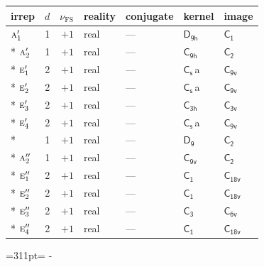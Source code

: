\documentclass[10pt,a4paper]{article}
\newcommand{\needspace}[1]{\par\penalty-100\begingroup\dimen0=#1\relax\dimen2=\pagegoal
  \advance\dimen2-\pagetotal\ifdim\dimen0>\dimen2\relax\ifdim\dimen2>0pt\vfil\break\fi\fi
  \endgroup}
\numberwithin{equation}{section}
\newcommand{\grp}[1]{\mathsf{#1}}
\newcommand{\irr}[1]{\text{\normalfont\scshape #1}}
\newcommand{\detbox}[1]{{\setlength{\fboxsep}{1pt}\fbox{#1}}}
\newcommand{\clsletter}[1]{\,{\scriptsize\color{black!55}#1}}
\newcommand{\fsind}{\nu_{\mathrm{FS}}}
\begin{document}
{\small\renewcommand{\arraystretch}{1.25}\begin{longtable}{@{}lrrllll@{}}\toprule
irrep & $d$ & $\fsind$ & reality & conjugate & kernel & image\\\midrule\endhead
\bottomrule\endfoot\endlastfoot
$\irr{a}_{1}'$ & 1 & $+1$ & real & --- & \href{D9h.pdf}{$\grp{D_{9h}}$} & \href{C1.pdf}{$\grp{C_{1}}$}\\*
$\irr{a}_{2}'$ & 1 & $+1$ & real & --- & \href{C9h.pdf}{$\grp{C_{9h}}$} & \href{C2.pdf}{$\grp{C_{2}}$}\\*
$\irr{e}_{1}'$ & 2 & $+1$ & real & --- & \href{C1v.pdf}{$\grp{C_{s}}$}\clsletter{a} & \href{C9v.pdf}{$\grp{C_{9v}}$}\\*
$\irr{e}_{2}'$ & 2 & $+1$ & real & --- & \href{C1v.pdf}{$\grp{C_{s}}$}\clsletter{a} & \href{C9v.pdf}{$\grp{C_{9v}}$}\\*
$\irr{e}_{3}'$ & 2 & $+1$ & real & --- & \href{C3h.pdf}{$\grp{C_{3h}}$} & \href{C3v.pdf}{$\grp{C_{3v}}$}\\*
$\irr{e}_{4}'$ & 2 & $+1$ & real & --- & \href{C1v.pdf}{$\grp{C_{s}}$}\clsletter{a} & \href{C9v.pdf}{$\grp{C_{9v}}$}\\*
\detbox{$\irr{a}_{1}''$} & 1 & $+1$ & real & --- & \href{D9.pdf}{$\grp{D_{9}}$} & \href{C2.pdf}{$\grp{C_{2}}$}\\*
$\irr{a}_{2}''$ & 1 & $+1$ & real & --- & \href{C9v.pdf}{$\grp{C_{9v}}$} & \href{C2.pdf}{$\grp{C_{2}}$}\\*
$\irr{e}_{1}''$ & 2 & $+1$ & real & --- & \href{C1.pdf}{$\grp{C_{1}}$} & $\grp{C_{18v}}$\\*
$\irr{e}_{2}''$ & 2 & $+1$ & real & --- & \href{C1.pdf}{$\grp{C_{1}}$} & $\grp{C_{18v}}$\\*
$\irr{e}_{3}''$ & 2 & $+1$ & real & --- & \href{C3.pdf}{$\grp{C_{3}}$} & \href{C6v.pdf}{$\grp{C_{6v}}$}\\*
$\irr{e}_{4}''$ & 2 & $+1$ & real & --- & \href{C1.pdf}{$\grp{C_{1}}$} & $\grp{C_{18v}}$\\
\bottomrule\end{longtable}}
\needspace{311pt}
\end{document}
